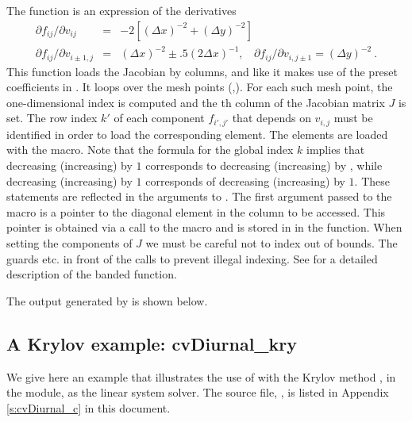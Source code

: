 The  function is an expression of the derivatives
\vspace*{-.08in}
\begin{eqnarray*}
\partial f_{ij} / \partial v_{ij} &=&
         -2 [(\Delta x)^{-2} + (\Delta y)^{-2}] \\
\partial f_{ij} / \partial v_{i \pm 1,j} &=& (\Delta x)^{-2} 
                  \pm .5 (2 \Delta x)^{-1}, ~~~~
\partial f_{ij} / \partial v_{i,j \pm 1}  =  (\Delta y)^{-2} ~. 
\end{eqnarray*}
This function loads the Jacobian by columns, and like  it
makes use of the preset coefficients in .
It loops over the mesh points (,). For each such mesh
point, the one-dimensional index  is computed
and the th column of the Jacobian matrix $J$ is set. 
The row index $k'$ of each component $f_{i',j'}$ that depends on
$v_{i,j}$ must be identified in order to load the corresponding element.
The elements are loaded with the  macro.
Note that the formula for the global index $k$ implies that decreasing 
(increasing)  by $1$ corresponds to decreasing (increasing) 
 by , while decreasing (increasing)  by $1$ 
corresponds of decreasing (increasing)  by $1$. 
These statements are reflected in the arguments to . 
The first argument passed to the  macro is a pointer to
the diagonal element in the column to be accessed. This pointer is obtained
via a call to the  macro and is stored in  in
the  function. When setting the components of $J$ we must be
careful not to index out of bounds. The guards  etc.
in front of the calls to  prevent illegal indexing.
See  for a detailed description of the banded 
function.

The output generated by  is shown below.



\subsection{A Krylov example: cvDiurnal\_kry}\label{ss:cvDiurnal}

We give here an example that illustrates the use of {\cvode} with the Krylov
method {\spgmr}, in the {\cvspgmr} module, as the linear system solver.  
The source file, , is listed in Appendix \ref{s:cvDiurnal_c}
in this document.

